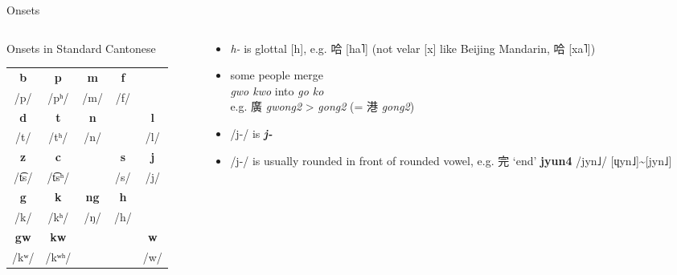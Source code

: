 \documentclass{beamer}
\begin{document}
\begin{frame}[fragile]{Onsets}

\begin{columns}
    \begin{column}{0.5\textwidth}
        Onsets in Standard Cantonese\\
        \bigskip
        \begin{tabular}{c c c c c}
            \hline
            \textbf{b} & \textbf{p} & \textbf{m} & \textbf{f} & \\ 
            /p/ & /pʰ/ & /m/ & /f/ & \\ \hline
            \textbf{d} & \textbf{t} & \textbf{n} & & \textbf{l} \\
            /t/ & /tʰ/ & /n/ & & /l/ \\ \hline
            \textbf{z} & \textbf{c} & & \textbf{s} & \textbf{j} \\
            /t͡s/ & /t͡sʰ/ & & /s/ & /j/ \\ \hline
            \textbf{g} & \textbf{k} & \textbf{ng} & \textbf{h} & \\
            /k/ & /kʰ/ & /ŋ/ & /h/ & \\ \hline
            \textbf{gw} & \textbf{kw} & & & \textbf{w} \\
            /kʷ/ & /kʷʰ/ & & & /w/ \\ \hline
        \end{tabular}
    \end{column}
    \begin{column}{0.5\textwidth} 
        \begin{itemize}
            \item \emph{h-} is glottal [h], e.g. 哈 [ha˥] (not velar [x] like Beijing Mandarin, 哈 [xa˥])
            \item some people merge\\ \emph{gwo kwo} into \emph{go ko}\\ e.g. 廣 \emph{gwong2} > \emph{gong2} (= 港 \emph{gong2})
            \item /j-/ is \emph{\textbf{j-}}
            \item /j-/ is usually rounded in front of rounded vowel, e.g. 完 \enquote*{end} \textbf{jyun4} /jyn˩/ [ɥyn˩]\~{}[jyn˩]
        \end{itemize}
    \end{column}
\end{columns}

\end{frame}
\end{document}
